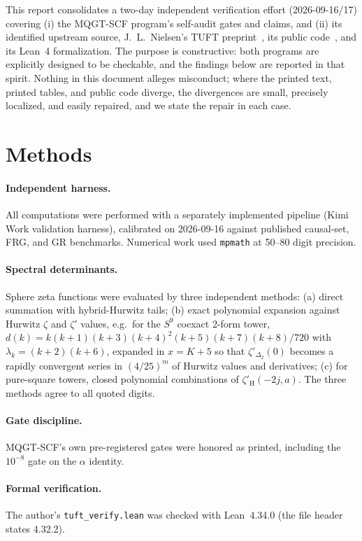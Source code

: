 \documentclass[11pt,letterpaper]{article}
\newcommand{\Sp}[1]{S^{#1}}
\begin{document}
This report consolidates a two-day independent verification effort
(2026-09-16/17) covering (i) the MQGT-SCF program's self-audit gates and
claims, and (ii) its identified upstream source, J.~L.~Nielsen's TUFT
preprint~\cite{nielsen2026}, its public code~\cite{nielsenrepo}, and its
Lean~4 formalization. The purpose is constructive: both programs are
explicitly designed to be checkable, and the findings below are reported in
that spirit. Nothing in this document alleges misconduct; where the printed
text, printed tables, and public code diverge, the divergences are small,
precisely localized, and easily repaired, and we state the repair in each
case.

\section{Methods}

\paragraph{Independent harness.} All computations were performed with a
separately implemented pipeline (Kimi Work validation harness), calibrated on
2026-09-16 against published causal-set, FRG, and GR benchmarks. Numerical
work used \texttt{mpmath} at 50--80 digit precision.

\paragraph{Spectral determinants.} Sphere zeta functions were evaluated by
three independent methods: (a) direct summation with hybrid-Hurwitz tails;
(b) exact polynomial expansion against Hurwitz $\zeta$ and $\zeta'$ values,
e.g.\ for the $\Sp{9}$ coexact 2-form tower,
$d(k)=k(k+1)(k+3)(k+4)^2(k+5)(k+7)(k+8)/720$ with
$\lambda_k=(k+2)(k+6)$, expanded in $x=K+5$ so that
$\zeta'_{\Delta_2}(0)$ becomes a rapidly convergent series in $(4/25)^m$ of
Hurwitz values and derivatives; (c) for pure-square towers, closed
polynomial combinations of $\zeta'_{\mathrm{H}}(-2j,a)$. The three methods
agree to all quoted digits.

\paragraph{Gate discipline.} MQGT-SCF's own pre-registered gates were honored
as printed, including the $10^{-8}$ gate on the $\alpha$ identity.

\paragraph{Formal verification.} The author's \texttt{tuft\_verify.lean} was
checked with Lean~4.34.0 (the file header states 4.32.2).
\end{document}
